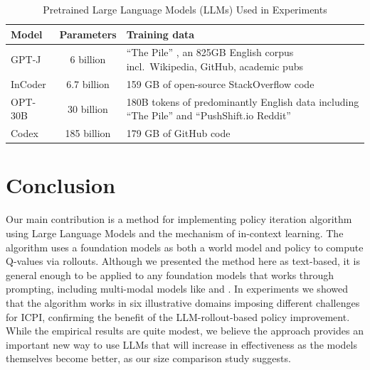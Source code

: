 \documentclass{article}
\begin{document}
\begin{table}[t]
  \centering
  \caption{Pretrained Large Language Models (LLMs) Used in Experiments}
  \label{tab:llms}

  \begin{tabular}{m{2in}cm{2.6in}}
    \toprule

    \textbf{Model}                           & \textbf{Parameters} & \textbf{Training data}                                   \\

    \midrule
    {GPT-J} \parencite{wang_gpt-j-6b_2021}   & 6 billion           & ``The Pile'' \parencite{gao_pile_2020}, an 825GB English
    corpus incl.\ Wikipedia, GitHub, academic pubs                                                                            \\


    \hdashline

    {InCoder} \parencite{fried_incoder_2022} & 6.7 billion         & 159 GB of open-source StackOverflow code                 \\
    \hdashline
    {OPT-30B} \parencite{zhang_opt_2022}     & 30 billion          & 180B tokens of predominantly English data
    including ``The Pile'' \parencite{gao_pile_2020} and ``PushShift.io Reddit'' \parencite{baumgartner_pushshift_2020}
    \\
    \hdashline

    {Codex} \parencite{chen_evaluating_2021} & 185 billion         & 179 GB of GitHub code                                    \\
    \bottomrule
  \end{tabular}
\end{table}




\section{Conclusion}


Our main contribution is a method for implementing policy iteration algorithm
using Large Language Models and the mechanism of in-context learning. The
algorithm uses a foundation models as both a world model and policy to compute
Q-values via rollouts. Although we presented the method here as text-based, it
is general enough to be applied to any foundation models that works through
prompting, including multi-modal models like \cite{reed_generalist_2022} and
\cite{seo_harp_2022}. In experiments we showed that the algorithm works in six
illustrative domains imposing different challenges for ICPI, confirming the
benefit of the LLM-rollout-based policy improvement. While the empirical results
are quite modest, we believe the approach provides an important new way to use
LLMs that will increase in effectiveness as the models themselves become better,
as our size comparison study suggests.
\end{document}
